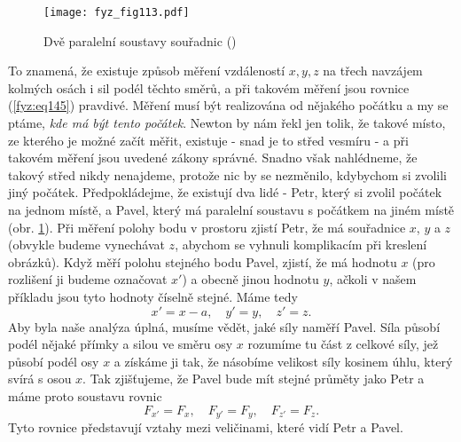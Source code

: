     \begin{figure}[ht!]  %
      \centering
      \texttt{[image: fyz\_fig113.pdf]}
      \caption{Dvě paralelní soustavy souřadnic (\cite[s.~154]{Feynman01})}
      \label{fyz:fig113}
    \end{figure}
    To znamená, že existuje způsob měření vzdáleností \(x, y, z\) na třech navzájem kolmých osách i
    sil podél těchto směrů, a při takovém měření jsou rovnice (\ref{fyz:eq145}) pravdivé. Měření
    musí být realizována od nějakého počátku a my se ptáme, \emph{kde má být tento počátek}. Newton
    by nám řekl jen tolik, že takové místo, ze kterého je možné začít měřit, existuje - snad je to
    střed vesmíru - a při takovém měření jsou uvedené zákony správné. Snadno však nahlédneme, že
    takový střed nikdy nenajdeme, protože nic by se nezměnilo, kdybychom si zvolili jiný počátek.
    Předpokládejme, že existují dva lidé - Petr, který si zvolil počátek na jednom místě, a Pavel,
    který má paralelní soustavu s počátkem na jiném místě (obr. \ref{fyz:fig113}). Při měření polohy
    bodu v prostoru zjistí Petr, že má souřadnice \(x\), \(y\) a \(z\) (obvykle budeme vynechávat
    \(z\), abychom se vyhnuli komplikacím při kreslení obrázků). Když měří polohu stejného bodu
    Pavel, zjistí, že má hodnotu \(x\) (pro rozlišení ji budeme označovat \(x'\)) a obecně jinou
    hodnotu \(y\), ačkoli v našem příkladu jsou tyto hodnoty číselně stejné. Máme tedy
    \begin{equation}\label{fyz:eq146}
      x' = x - a, \quad y' = y, \quad z' = z.
    \end{equation}
    Aby byla naše analýza úplná, musíme vědět, jaké síly naměří Pavel. Síla působí podél nějaké 
    přímky a silou ve směru osy \(x\) rozumíme tu část z celkové síly, jež působí podél osy \(x\) a 
    získáme ji tak, že násobíme velikost síly kosinem úhlu, který svírá s osou \(x\). Tak 
    zjišťujeme, že Pavel bude mít stejné průměty jako Petr a máme proto soustavu rovnic
    \begin{equation}\label{fyz:eq147}
      F_{x'} = F_x, \quad F_{y'} = F_y, \quad F_{z'} = F_z.
    \end{equation}
    Tyto rovnice představují vztahy mezi veličinami, které vidí Petr a Pavel.
    
